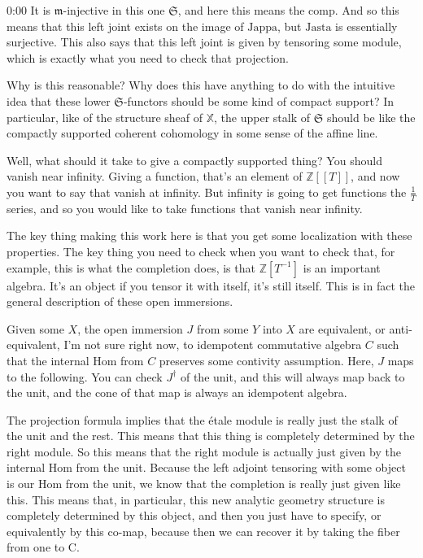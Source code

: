 \begin{unfinished}{0:00}
It is $\mathfrak{m}$-injective in this one $\mathfrak{S}$, and here this means the comp. And so this means that this left joint exists on the image of $\text{Jappa}$, but $\text{Jasta}$ is essentially surjective. This also says that this left joint is given by tensoring some module, which is exactly what you need to check that projection.

Why is this reasonable? Why does this have anything to do with the intuitive idea that these lower $\mathfrak{S}$-functors should be some kind of compact support? In particular, like of the structure sheaf of $\mathbb{X}$, the upper stalk of $\mathfrak{S}$ should be like the compactly supported coherent cohomology in some sense of the affine line. 

Well, what should it take to give a compactly supported thing? You should vanish near infinity. Giving a function, that's an element of $\mathbb{Z}[[T]]$, and now you want to say that vanish at infinity. But infinity is going to get functions the $\frac{1}{T}$ series, and so you would like to take functions that vanish near infinity. 

The key thing making this work here is that you get some localization with these properties. The key thing you need to check when you want to check that, for example, this is what the completion does, is that $\mathbb{Z}[T^{-1}]$ is an important algebra. It's an object if you tensor it with itself, it's still itself. This is in fact the general description of these open immersions.

Given some $X$, the open immersion $J$ from some $Y$ into $X$ are equivalent, or anti-equivalent, I'm not sure right now, to idempotent commutative algebra $C$ such that the internal Hom from $C$ preserves some contivity assumption. Here, $J$ maps to the following. You can check $J^\dagger$ of the unit, and this will always map back to the unit, and the cone of that map is always an idempotent algebra.

The projection formula implies that the étale module is really just the stalk of the unit and the rest. This means that this thing is completely determined by the right module. So this means that the right module is actually just given by the internal Hom from the unit. Because the left adjoint tensoring with some object is our Hom from the unit, we know that the completion is really just given like this. This means that, in particular, this new analytic geometry structure is completely determined by this object, and then you just have to specify, or equivalently by this co-map, because then we can recover it by taking the fiber from one to C.


\end{unfinished}
